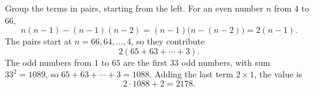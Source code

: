 Group the terms in pairs, starting from the left. For an even number $n$ from $4$ to $66$,
\[n(n-1)-(n-1)(n-2)=(n-1)\bigl(n-(n-2)\bigr)=2(n-1).\]
The pairs start at $n=66,64,\dots,4$, so they contribute
\[2(65+63+\cdots+3).\]
The odd numbers from $1$ to $65$ are the first $33$ odd numbers, with sum $33^2=1089$, so $65+63+\cdots+3=1088$. Adding the last term $2\times1$, the value is
\[2\cdot1088+2=\boxed{2178}.\]
